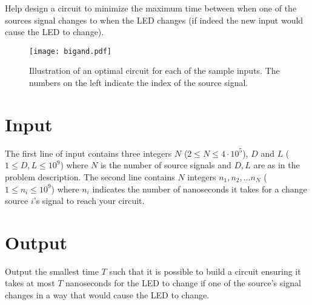 Help design a circuit to minimize the maximum time between when one of the sources signal changes
to when the LED changes (if indeed the new input would cause the LED to change).

\begin{figure}[h]
  \begin{center}
  \texttt{[image: bigand.pdf]}
  \caption{Illustration of an optimal circuit for each of the sample inputs. The numbers on the left indicate the index of the source signal.}
  \end{center}
\end{figure}

\section*{Input}

The first line of input contains three integers $N$ ($2 \leq N \leq 4 \cdot 10^5$), $D$ and $L$ ($1 \leq D,L \leq 10^9$) where $N$ is the number of source signals and $D,L$ are as in the problem description. The second line contains $N$ integers $n_1, n_2, \ldots n_N$ ($1 \leq n_i \leq 10^9$) where $n_i$ indicates the number of nanoseconds it takes for a change source $i$'s signal to reach your circuit.

\section*{Output}
Output the smallest time $T$ such that it is possible to build a circuit ensuring
it takes at most $T$ nanoseconds for the LED to change if one of the source's signal changes
in a way that would cause the LED to change.
